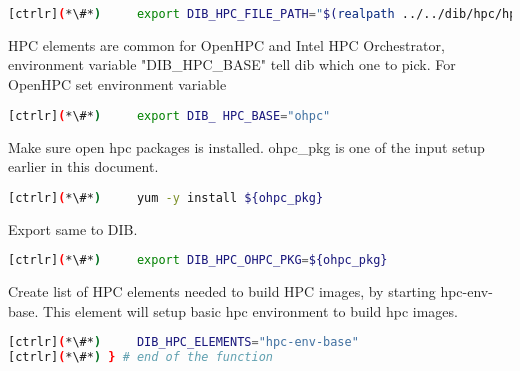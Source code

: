 \begin{lstlisting}[language=bash,keywords={}]
[ctrlr](*\#*)     export DIB_HPC_FILE_PATH="$(realpath ../../dib/hpc/hpc-files/)"
\end{lstlisting}

HPC elements are common for OpenHPC and Intel HPC Orchestrator, environment variable "DIB\_HPC\_BASE" tell dib which one to pick. For OpenHPC set environment variable

\begin{lstlisting}[language=bash,keywords={}]
[ctrlr](*\#*)     export DIB_ HPC_BASE="ohpc"
\end{lstlisting}

Make sure open hpc packages is installed. ohpc\_pkg is one of the input setup earlier in this document.

\begin{lstlisting}[language=bash,keywords={}]
[ctrlr](*\#*)     yum -y install ${ohpc_pkg}
\end{lstlisting}

Export same to DIB.

\begin{lstlisting}[language=bash,keywords={}]
[ctrlr](*\#*)     export DIB_HPC_OHPC_PKG=${ohpc_pkg}
\end{lstlisting}

Create list of HPC elements needed to build HPC images, by starting hpc-env-base. This element will setup basic hpc environment to build hpc images.

\begin{lstlisting}[language=bash,keywords={}]
[ctrlr](*\#*)     DIB_HPC_ELEMENTS="hpc-env-base"
[ctrlr](*\#*) } # end of the function
\end{lstlisting}

